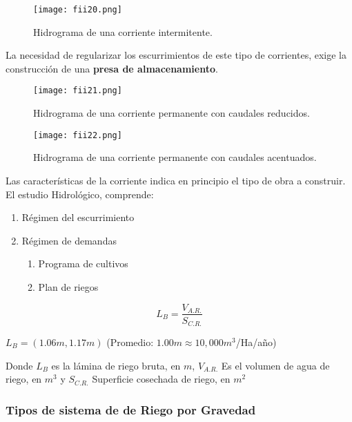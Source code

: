\begin{figure}[h!]
	\centerline{\texttt{[image: fii20.png]}}
	\caption{Hidrograma de una corriente intermitente.}
	\label{fii20}
\end{figure}
La necesidad de regularizar los escurrimientos de este tipo de corrientes, exige
la construcción de una \textbf{presa de almacenamiento}.
\begin{figure}[h!]
	\centerline{\texttt{[image: fii21.png]}}
	\caption{Hidrograma de una corriente permanente con caudales reducidos.}
	\label{fii21}
\end{figure}

\begin{figure}[h!]
	\centerline{\texttt{[image: fii22.png]}}
	\caption{ Hidrograma de una corriente permanente con caudales acentuados.}
	\label{fii22}
\end{figure}

Las características de la corriente indica en principio el tipo de obra a construir. El estudio Hidrológico, comprende:

\begin{enumerate}
	\item Régimen del escurrimiento
	\item Régimen de demandas
	      \begin{enumerate}
		      \item Programa de cultivos
		      \item Plan de riegos
	      \end{enumerate}
\end{enumerate}


\begin{equation}
	L_{B}= \frac{V_{A.R.}}{S_{C.R.}}
\end{equation}

$L_{B} = (1{.}06m , 1{.}17m)$ (Promedio: $1{.}00m \approx 10,000 m^3$/Ha/año)

Donde $L_{B}$ es la lámina de riego bruta, en $m$, $V_{A.R.}$ Es el volumen de agua de riego, en $m^3$ y
$S_{C.R.}$ Superficie cosechada de riego, en $m^2 $

\subsubsection{Tipos de sistema de de Riego por Gravedad}

